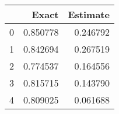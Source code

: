 \begin{tabular}{lrr}
\toprule
 & Exact & Estimate \\
\midrule
0 & 0.850778 & 0.246792 \\
1 & 0.842694 & 0.267519 \\
2 & 0.774537 & 0.164556 \\
3 & 0.815715 & 0.143790 \\
4 & 0.809025 & 0.061688 \\
\bottomrule
\end{tabular}
